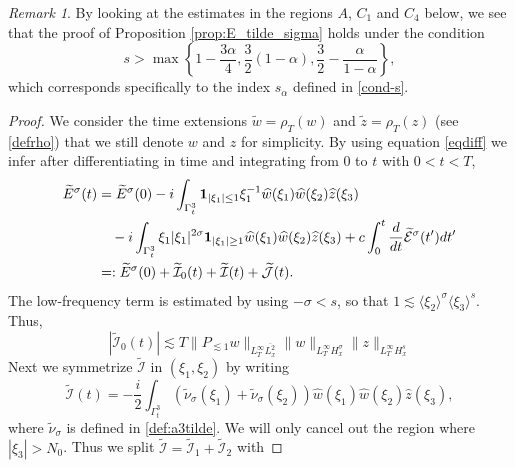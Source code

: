 \documentclass{amsart}
\theoremstyle{definition}
\theoremstyle{remark}
\newtheorem{remark}[theorem]{Remark}
\def\R{{\mathbb R}}
\numberwithin{equation}{section}
\begin{document}
\begin{remark}
By looking at  the estimates in the regions $A$, $C_1$ and $C_4$ below, we see that the proof of Proposition \ref{prop:E_tilde_sigma} holds under the condition
\[ s>\max\left\{1-\frac{3\alpha}4,\frac32(1-\alpha), \frac32-\frac{\alpha}{1-\alpha}\right\}, \] 
which corresponds specifically to the index $s_{\alpha}$ defined in \eqref{cond-s}. 
\end{remark}

\begin{proof}
  We consider the time extensions $\widetilde{w} = \rho_T(w)$ and $\widetilde{z}=\rho_T(z)$ (see \eqref{defrho}) that we still denote $w$ and $z$ for simplicity. By using equation \eqref{eqdiff} we infer after differentiating in time and integrating from $0$ to $t$ with $0<t<T$,
\begin{align}
\widetilde{E}^\sigma(t) %
&= \widetilde{E}^\sigma(0) -i\int_{\Gamma^3_t} {\bf 1}_{|\xi_1|\le 1}\xi_1^{-1}\widehat{w}(\xi_1) \widehat{w}(\xi_2)\widehat{z}(\xi_3)  \notag \\
&\quad  -i \int_{\Gamma^3_t}\xi_1|\xi_1|^{2\sigma} {\bf 1}_{|\xi_1|\ge 1} \widehat{w}(\xi_1) \widehat{w}(\xi_2)\widehat{z}(\xi_3) +c\int_0^t \frac{d}{dt}\widetilde{\mathcal{E}}^{\sigma}(t')dt' \notag \\
&=: \widetilde{E}^\sigma(0) + \widetilde{\mathcal{I}}_0(t) + \widetilde{\mathcal{I}}(t) + \widetilde{\mathcal{J}}(t). \label{est:Esigma.1}
\end{align}
The low-frequency term is estimated by using $-\sigma<s$, so that $1 \lesssim \langle \xi_2 \rangle^{\sigma} \langle \xi_3 \rangle^{s} $. Thus,
\begin{equation}\label{est:Esigma.2}
|\widetilde{\mathcal{I}}_0(t)| \lesssim T \|P_{\lesssim 1}w\|_{L^\infty_T\overline{L^2_x}} \|w\|_{L^\infty_TH^\sigma_x} \|z\|_{L^\infty_TH^s_x}
\end{equation}
Next we symmetrize $\widetilde{\mathcal{I}}$ in $(\xi_1, \xi_2)$ by writing
$$
\widetilde{\mathcal{I}}(t) = -\frac i2 \int_{\Gamma^3_t} (\widetilde{\nu}_\sigma(\xi_1)+\widetilde{\nu}_\sigma(\xi_2))  \widehat{w}(\xi_1) \widehat{w}(\xi_2)\widehat{z}(\xi_3) ,
$$
where $\widetilde{\nu}_\sigma$ is defined in \eqref{def:a3tilde}.
We will only cancel out the region where $|\xi_3|>N_0$. Thus we split $\widetilde{\mathcal{I}}=\widetilde{\mathcal{I}}_1+\widetilde{\mathcal{I}}_2$ with

\end{proof}
\end{document}
